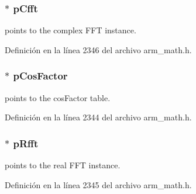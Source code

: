 \subsubsection[{\texorpdfstring{p\+Cfft}{pCfft}}]{$\ast$ p\+Cfft}\hypertarget{structarm__dct4__instance__q15_ae0ac7c3a89699793fc0dac960db7f056}{}\label{structarm__dct4__instance__q15_ae0ac7c3a89699793fc0dac960db7f056}
points to the complex F\+FT instance. 

Definición en la línea 2346 del archivo arm\+\_\+math.\+h.

\subsubsection[{\texorpdfstring{p\+Cos\+Factor}{pCosFactor}}]{$\ast$ p\+Cos\+Factor}\hypertarget{structarm__dct4__instance__q15_a9d858d313cbba67ceaef9704bc9c43b0}{}\label{structarm__dct4__instance__q15_a9d858d313cbba67ceaef9704bc9c43b0}
points to the cos\+Factor table. 

Definición en la línea 2344 del archivo arm\+\_\+math.\+h.

\subsubsection[{\texorpdfstring{p\+Rfft}{pRfft}}]{$\ast$ p\+Rfft}\hypertarget{structarm__dct4__instance__q15_aea6aa42c838f2b22c8c31e9e259b8d75}{}\label{structarm__dct4__instance__q15_aea6aa42c838f2b22c8c31e9e259b8d75}
points to the real F\+FT instance. 

Definición en la línea 2345 del archivo arm\+\_\+math.\+h.

